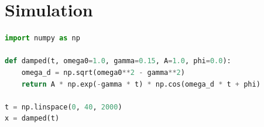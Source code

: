 \documentclass[11pt]{article}
\begin{document}
\section{Simulation}

\begin{lstlisting}[language=Python]
import numpy as np

def damped(t, omega0=1.0, gamma=0.15, A=1.0, phi=0.0):
    omega_d = np.sqrt(omega0**2 - gamma**2)
    return A * np.exp(-gamma * t) * np.cos(omega_d * t + phi)

t = np.linspace(0, 40, 2000)
x = damped(t)
\end{lstlisting}



\end{document}
